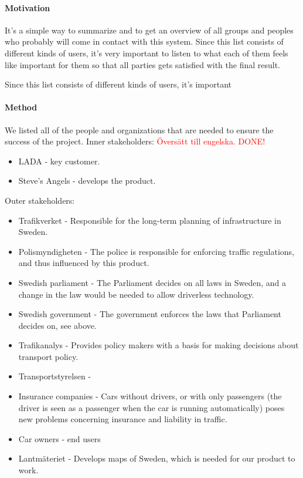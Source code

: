 \documentclass[10pt]{article}
\newcommand\todo[1]{\textcolor{red}{#1}}
\begin{document}
\paragraph{Motivation}
\hfill \break
It’s a simple way to summarize and to get an overview of all groups and peoples who probably will come in contact with this system. Since this list consists of different kinds of users, it's very important to listen to what each of them feels like important for them so that all parties gets satisfied with the final result.

Since this list consists of different kinds of users, it's important 
\paragraph{Method}
\hfill \break
We listed all of the people and organizations that are needed to ensure the success of the project. 
Inner stakeholders:
\todo{Översätt till engelska. DONE!}
\begin{itemize}
\item LADA - key customer. 
\item Steve's Angels - develops the product. 
\end{itemize}

Outer stakeholders:
\begin{itemize}
\item Trafikverket - Responsible for the long-term planning of infrastructure in Sweden.
\item Polismyndigheten - The police is responsible for enforcing traffic regulations, and thus influenced by this product.
\item Swedish parliament - The Parliament decides on all laws in Sweden, and a change in the law would be needed to allow driverless technology.
\item Swedish government - The government enforces the laws that Parliament decides on, see above.
\item Trafikanalys - Provides policy makers with a basis for making decisions about transport policy.
\item Transportstyrelsen - 
\item Insurance companies - Cars without drivers, or with only passengers (the driver is seen as a passenger when the car is running automatically) poses new problems concerning insurance and liability in traffic.
\item Car owners - end users
\item Lantmäteriet - Develops maps of Sweden, which is needed for our product to work.
\end{itemize}
\end{document}
